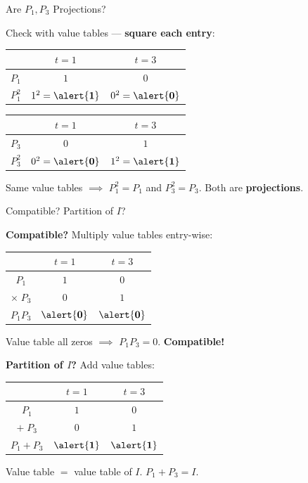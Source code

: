 \documentclass[10pt]{beamer}
\theoremstyle{definition}
\newcommand{\x}[1]{\alert{\textbf{#1}}}
\begin{document}
\begin{frame}{Are $P_1, P_3$ Projections?}

Check with value tables --- \x{square each entry}:

\vfill

\begin{center}
\renewcommand{\arraystretch}{1.3}
\begin{tabular}{c|cc}
 & $t = 1$ & $t = 3$ \\
\hline
$P_1$ & $1$ & $0$ \\
$P_1^2$ & $1^2 = \x{1}$ & $0^2 = \x{0}$
\end{tabular}
\qquad\qquad
\begin{tabular}{c|cc}
 & $t = 1$ & $t = 3$ \\
\hline
$P_3$ & $0$ & $1$ \\
$P_3^2$ & $0^2 = \x{0}$ & $1^2 = \x{1}$
\end{tabular}
\end{center}

\vfill

Same value tables $\implies$ $P_1^2 = P_1$ and $P_3^2 = P_3$. \quad Both are \x{projections}. \;\checkmark

\end{frame}


\begin{frame}[shrink=5]{Compatible? Partition of $I$?}

\x{Compatible?} Multiply value tables entry-wise:

\begin{center}
\renewcommand{\arraystretch}{1.3}
\begin{tabular}{c|cc}
 & $t = 1$ & $t = 3$ \\
\hline
$P_1$ & $1$ & $0$ \\
$\times\; P_3$ & $0$ & $1$ \\
\hline
$P_1 P_3$ & $\x{0}$ & $\x{0}$
\end{tabular}
\end{center}

Value table all zeros $\implies$ $P_1 P_3 = 0$. \quad \x{Compatible!} \;\checkmark

\vfill\pause

\x{Partition of $I$?} Add value tables:

\begin{center}
\renewcommand{\arraystretch}{1.3}
\begin{tabular}{c|cc}
 & $t = 1$ & $t = 3$ \\
\hline
$P_1$ & $1$ & $0$ \\
$+\; P_3$ & $0$ & $1$ \\
\hline
$P_1 + P_3$ & $\x{1}$ & $\x{1}$
\end{tabular}
\end{center}

Value table $= $ value table of $I$. \quad $P_1 + P_3 = I$. \;\checkmark

\end{frame}
\end{document}
